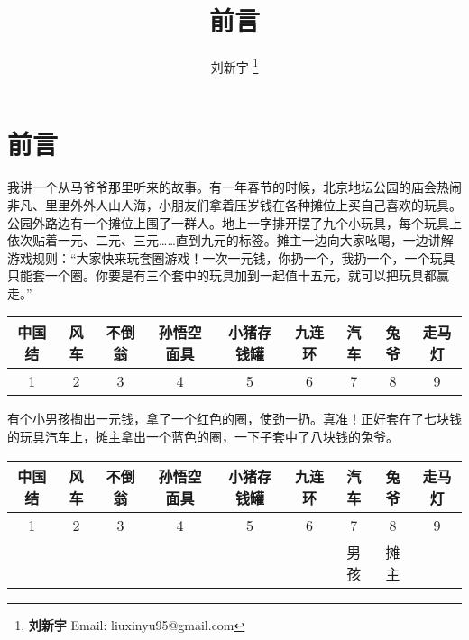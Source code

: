 \documentclass[UTF8]{article}
\begin{document}
\title{前言}

\author{刘新宇
\thanks{{\bfseries 刘新宇} \newline
  Email: liuxinyu95@gmail.com \newline}
  }

\maketitle
\fi


\chapter*{前言}

我讲一个从马爷爷那里听来的故事。有一年春节的时候，北京地坛公园的庙会热闹非凡、里里外外人山人海，小朋友们拿着压岁钱在各种摊位上买自己喜欢的玩具。公园外路边有一个摊位上围了一群人。地上一字排开摆了九个小玩具，每个玩具上依次贴着一元、二元、三元……直到九元的标签。摊主一边向大家吆喝，一边讲解游戏规则：“大家快来玩套圈游戏！一次一元钱，你扔一个，我扔一个，一个玩具只能套一个圈。你要是有三个套中的玩具加到一起值十五元，就可以把玩具都赢走。”

\vspace{5mm}
\begin{tabular}{|c|c|c|c|c|c|c|c|c|}
\hline
中国结 & 风车 & 不倒翁 & 孙悟空面具 & 小猪存钱罐 & 九连环 & 汽车 & 兔爷 & 走马灯 \\
\hline
1 & 2 & 3 & 4 & 5 & 6 & 7 & 8 & 9 \\
\hline
\end{tabular}
\vspace{5mm}

有个小男孩掏出一元钱，拿了一个红色的圈，使劲一扔。真准！正好套在了七块钱的玩具汽车上，摊主拿出一个蓝色的圈，一下子套中了八块钱的兔爷。

\vspace{5mm}
\begin{tabular}{|c|c|c|c|c|c|c|c|c|}
\hline
中国结 & 风车 & 不倒翁 & 孙悟空面具 & 小猪存钱罐 & 九连环 & 汽车 & 兔爷 & 走马灯 \\
\hline
1 & 2 & 3 & 4 & 5 & 6 & 7 & 8 & 9 \\
\hline
  &   &   &   &   &   & 男孩 & 摊主 & \\
\hline
\end{tabular}
\vspace{5mm}
\end{document}

